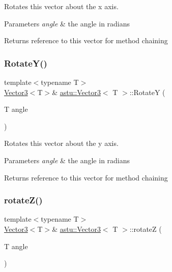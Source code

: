 Rotates this vector about the x axis.


\begin{DoxyParams}{Parameters}
{\em angle} & the angle in radians \\
\hline
\end{DoxyParams}
\begin{DoxyReturn}{Returns}
reference to this vector for method chaining 
\end{DoxyReturn}
\mbox{\label{classastu_1_1Vector3_af2d98a2b2d74b6e9f0785fa6f3ace9c0}} 
\subsubsection{\texorpdfstring{Rotate\+Y()}{RotateY()}}
{\footnotesize\ttfamily template$<$typename T$>$ \\
\hyperlink{classastu_1_1Vector3}{Vector3}$<$T$>$\& \hyperlink{classastu_1_1Vector3}{astu\+::\+Vector3}$<$ T $>$\+::RotateY (\begin{DoxyParamCaption}\item[{T}]{angle }\end{DoxyParamCaption})\hspace{0.3cm}{\ttfamily [inline]}}

Rotates this vector about the y axis.


\begin{DoxyParams}{Parameters}
{\em angle} & the angle in radians \\
\hline
\end{DoxyParams}
\begin{DoxyReturn}{Returns}
reference to this vector for method chaining 
\end{DoxyReturn}
\mbox{\label{classastu_1_1Vector3_a04a7b7fd1553048efef60e8aa38be1db}} 
\subsubsection{\texorpdfstring{rotate\+Z()}{rotateZ()}}
{\footnotesize\ttfamily template$<$typename T$>$ \\
\hyperlink{classastu_1_1Vector3}{Vector3}$<$T$>$\& \hyperlink{classastu_1_1Vector3}{astu\+::\+Vector3}$<$ T $>$\+::rotateZ (\begin{DoxyParamCaption}\item[{T}]{angle }\end{DoxyParamCaption})\hspace{0.3cm}{\ttfamily [inline]}}

